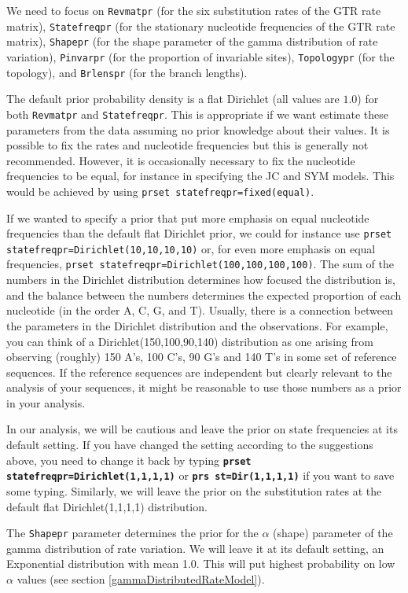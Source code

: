 \documentclass[12pt]{book}
\newcommand{\ttt}[1]{\texttt{#1}}
\newcommand{\tb}[1]{\ttt{\textbf{#1}}}
\begin{document}
We need to focus on \ttt{Revmatpr} (for the six substitution rates of the GTR rate matrix),
\ttt{Statefreqpr} (for the stationary nucleotide frequencies of the GTR rate matrix), \ttt{Shapepr}
(for the shape parameter of the gamma distribution of rate variation), \ttt{Pinvarpr} (for the
proportion of invariable sites), \ttt{Topologypr} (for the topology), and \ttt{Brlenspr} (for the
branch lengths).

The default prior probability density is a flat Dirichlet (all values are $1.0$) for both
\ttt{Revmatpr} and \ttt{Statefreqpr}. This is appropriate if we want estimate these parameters from
the data assuming no prior knowledge about their values. It is possible to fix the rates and
nucleotide frequencies but this is generally not recommended. However, it is occasionally necessary
to fix the nucleotide frequencies to be equal, for instance in specifying the JC and SYM models.
This would be achieved by using \ttt{prset statefreqpr=fixed(equal)}.

If we wanted to specify a prior that put more emphasis on equal nucleotide frequencies than the
default flat Dirichlet prior, we could for instance use \ttt{prset
statefreqpr=Dirichlet(10,10,10,10)} or, for even more emphasis on equal frequencies, \ttt{prset
statefreqpr=Dirichlet(100,100,100,100)}. The sum of the numbers in the Dirichlet distribution
determines how focused the distribution is, and the balance between the numbers determines the
expected proportion of each nucleotide (in the order A, C, G, and T). Usually, there is a
connection between the parameters in the Dirichlet distribution and the observations. For example,
you can think of a Dirichlet(150,100,90,140) distribution as one arising from observing (roughly)
150 A's, 100 C's, 90 G's and 140 T's in some set of reference sequences. If the reference sequences
are independent but clearly relevant to the analysis of your sequences, it might be reasonable to
use those numbers as a prior in your analysis.

In our analysis, we will be cautious and leave the prior on state frequencies at its default
setting. If you have changed the setting according to the suggestions above, you need to change it
back by typing \tb{prset statefreqpr=Dirichlet(1,1,1,1)} or \tb{prs st=Dir(1,1,1,1)} if you want to
save some typing. Similarly, we will leave the prior on the substitution rates at the default flat
Dirichlet(1,1,1,1) distribution.

The \ttt{Shapepr} parameter determines the prior for the $\alpha$ (shape) parameter of the gamma
distribution of rate variation. We will leave it at its default setting, an Exponential
distribution with mean 1.0. This will put highest probability on low $\alpha$ values (see section
\ref{gammaDistributedRateModel}).
\end{document}
